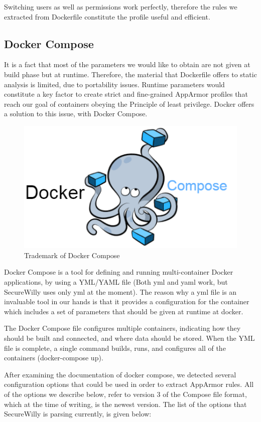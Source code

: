 Switching users as well as permissions work perfectly, therefore the rules we extracted from Dockerfile constitute the profile useful and efficient.

\subsection{Docker Compose} \label{dockcomp}
It is a fact that most of the parameters we would like to obtain are not given at build phase but at runtime. Therefore, the material that Dockerfile offers to static analysis is limited, due to portability issues. Runtime parameters would constitute a key factor to create strict and fine-grained AppArmor profiles that reach our goal of containers obeying the Principle of least privilege. Docker offers a solution to this issue, with Docker Compose.

\begin{figure}[h!]
  \centering
   \includegraphics[width=0.5\linewidth]{../figures/dockercompose.png}
   \caption{Trademark of Docker Compose}
\end{figure}

Docker Compose is a tool for defining and running multi-container Docker applications, by using a YML/YAML file (Both yml and yaml work, but SecureWilly uses only yml at the moment). The reason why a yml file is an invaluable tool in our hands is that it provides a configuration for the container which includes a set of parameters that should be given at runtime at docker.

The Docker Compose file configures multiple containers, indicating how they should be built and connected, and where data should be stored. When the YML file is complete, a single command builds, runs, and configures all of the containers (docker-compose up).

After examining the documentation of docker compose, we detected several configuration options that could be used in order to extract AppArmor rules. All of the options we describe below, refer to version 3 of the Compose file format, which at the time of writing, is the newest version.
The list of the options that SecureWilly is parsing currently, is given below:

